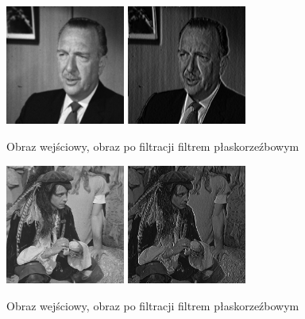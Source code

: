 \documentclass[final,a4paper,openany,12pt]{mwbk}
\begin{document}
\begin{figure}[H]
	\begin{center}
		\includegraphics[width=0.35\textwidth]{gentelman_gray}
		\includegraphics[width=0.35\textwidth]{gentelman_gray_reliefPrewitt_result}
	\end{center}
	\caption{Obraz wejściowy, obraz po filtracji filtrem płaskorzeźbowym}
\end{figure}

\begin{figure}[H]
	\begin{center}
		\includegraphics[width=0.35\textwidth]{pirate_gray}
		\includegraphics[width=0.35\textwidth]{pirate_gray_reliefPrewitt_result}
	\end{center}
	\caption{Obraz wejściowy, obraz po filtracji filtrem płaskorzeźbowym}
\end{figure}
\end{document}
